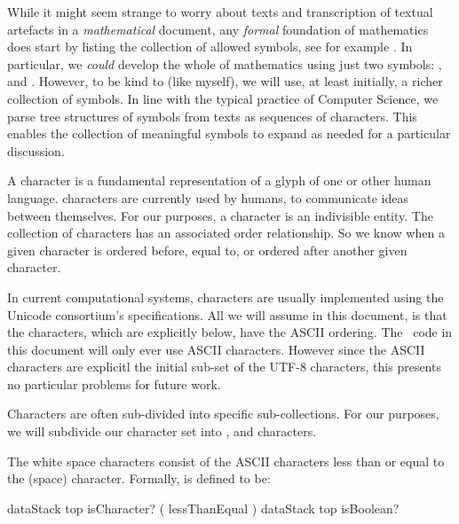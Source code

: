 While it might seem strange to worry about texts and transcription of 
textual artefacts in a \emph{mathematical} document, any \emph{formal} 
foundation of mathematics does start by listing the collection of allowed 
symbols, see for example \cite{kleene2009introMetaMathematics}. In 
particular, we \emph{could} develop the whole of mathematics using just 
two symbols: \quote{(}, and \quote{)}. However, to be kind to  (like myself), we will use, at least initially, a 
richer collection of symbols. In line with the typical practice of 
Computer Science, we parse tree structures of symbols from texts as 
sequences of characters. This enables the collection of meaningful symbols 
to expand as needed for a particular discussion. 

\subChapterAppendix[title=Characters, reference=characterSpec]

A character is a fundamental representation of a glyph of one or other 
human language.  characters are currently used by humans, 
to communicate ideas between themselves. For our purposes, a character is 
an indivisible entity. The collection of characters has an associated 
order relationship. So we know when a given character is ordered before, 
equal to, or ordered after another given character. 

In current computational systems, characters are usually implemented using 
the Unicode consortium's  specifications. All we will assume 
in this document, is that the characters, which are explicitly 
 below, have the  ASCII ordering. The 
\joylol\ code in this document will only ever use ASCII characters. 
However since the ASCII characters are explicitl the initial sub-set of 
the UTF-8 characters, this presents no particular problems for future 
work. 

Characters are often sub-divided into specific  
sub-collections. For our purposes, we will subdivide our character set 
into ,  and  
characters. 

\startDefinition

The white space characters consist of the ASCII characters less than or 
equal to the \quote{~} (space) character. Formally,  is 
defined to be: 

\starttyping
{ dataStack top isCharacter? }
( \space lessThanEqual )
{ dataStack top isBoolean? }
\stoptyping


